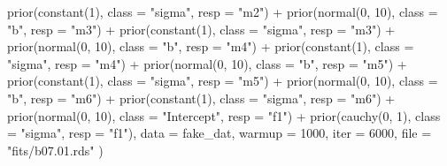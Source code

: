 \documentclass[
  letterpaper,
  DIV=11,
  numbers=noendperiod]{scrreprt}
\newenvironment{Shaded}{\begin{snugshade}}{\end{snugshade}}
\newcommand{\AttributeTok}[1]{\textcolor[rgb]{0.40,0.45,0.13}{#1}}
\newcommand{\DecValTok}[1]{\textcolor[rgb]{0.68,0.00,0.00}{#1}}
\newcommand{\FunctionTok}[1]{\textcolor[rgb]{0.28,0.35,0.67}{#1}}
\newcommand{\NormalTok}[1]{\textcolor[rgb]{0.00,0.23,0.31}{#1}}
\newcommand{\SpecialCharTok}[1]{\textcolor[rgb]{0.37,0.37,0.37}{#1}}
\newcommand{\StringTok}[1]{\textcolor[rgb]{0.13,0.47,0.30}{#1}}
\begin{document}
\begin{Shaded}
\begin{Highlighting}[]
    \FunctionTok{prior}\NormalTok{(}\FunctionTok{constant}\NormalTok{(}\DecValTok{1}\NormalTok{), }\AttributeTok{class =} \StringTok{"sigma"}\NormalTok{, }\AttributeTok{resp =} \StringTok{"m2"}\NormalTok{) }\SpecialCharTok{+}
    \FunctionTok{prior}\NormalTok{(}\FunctionTok{normal}\NormalTok{(}\DecValTok{0}\NormalTok{, }\DecValTok{10}\NormalTok{), }\AttributeTok{class =} \StringTok{"b"}\NormalTok{, }\AttributeTok{resp =} \StringTok{"m3"}\NormalTok{) }\SpecialCharTok{+}
    \FunctionTok{prior}\NormalTok{(}\FunctionTok{constant}\NormalTok{(}\DecValTok{1}\NormalTok{), }\AttributeTok{class =} \StringTok{"sigma"}\NormalTok{, }\AttributeTok{resp =} \StringTok{"m3"}\NormalTok{) }\SpecialCharTok{+}
    \FunctionTok{prior}\NormalTok{(}\FunctionTok{normal}\NormalTok{(}\DecValTok{0}\NormalTok{, }\DecValTok{10}\NormalTok{), }\AttributeTok{class =} \StringTok{"b"}\NormalTok{, }\AttributeTok{resp =} \StringTok{"m4"}\NormalTok{) }\SpecialCharTok{+}
    \FunctionTok{prior}\NormalTok{(}\FunctionTok{constant}\NormalTok{(}\DecValTok{1}\NormalTok{), }\AttributeTok{class =} \StringTok{"sigma"}\NormalTok{, }\AttributeTok{resp =} \StringTok{"m4"}\NormalTok{) }\SpecialCharTok{+}
    \FunctionTok{prior}\NormalTok{(}\FunctionTok{normal}\NormalTok{(}\DecValTok{0}\NormalTok{, }\DecValTok{10}\NormalTok{), }\AttributeTok{class =} \StringTok{"b"}\NormalTok{, }\AttributeTok{resp =} \StringTok{"m5"}\NormalTok{) }\SpecialCharTok{+}
    \FunctionTok{prior}\NormalTok{(}\FunctionTok{constant}\NormalTok{(}\DecValTok{1}\NormalTok{), }\AttributeTok{class =} \StringTok{"sigma"}\NormalTok{, }\AttributeTok{resp =} \StringTok{"m5"}\NormalTok{) }\SpecialCharTok{+}
    \FunctionTok{prior}\NormalTok{(}\FunctionTok{normal}\NormalTok{(}\DecValTok{0}\NormalTok{, }\DecValTok{10}\NormalTok{), }\AttributeTok{class =} \StringTok{"b"}\NormalTok{, }\AttributeTok{resp =} \StringTok{"m6"}\NormalTok{) }\SpecialCharTok{+}
    \FunctionTok{prior}\NormalTok{(}\FunctionTok{constant}\NormalTok{(}\DecValTok{1}\NormalTok{), }\AttributeTok{class =} \StringTok{"sigma"}\NormalTok{, }\AttributeTok{resp =} \StringTok{"m6"}\NormalTok{) }\SpecialCharTok{+}
    \FunctionTok{prior}\NormalTok{(}\FunctionTok{normal}\NormalTok{(}\DecValTok{0}\NormalTok{, }\DecValTok{10}\NormalTok{), }\AttributeTok{class =} \StringTok{"Intercept"}\NormalTok{, }\AttributeTok{resp =} \StringTok{"f1"}\NormalTok{) }\SpecialCharTok{+}
    \FunctionTok{prior}\NormalTok{(}\FunctionTok{cauchy}\NormalTok{(}\DecValTok{0}\NormalTok{, }\DecValTok{1}\NormalTok{), }\AttributeTok{class =} \StringTok{"sigma"}\NormalTok{, }\AttributeTok{resp =} \StringTok{"f1"}\NormalTok{),}
  \AttributeTok{data =}\NormalTok{ fake\_dat,}
  \AttributeTok{warmup =} \DecValTok{1000}\NormalTok{,}
  \AttributeTok{iter =} \DecValTok{6000}\NormalTok{,}
  \AttributeTok{file =} \StringTok{"fits/b07.01.rds"}
\NormalTok{)}
\end{Highlighting}
\end{Shaded}
\end{document}

